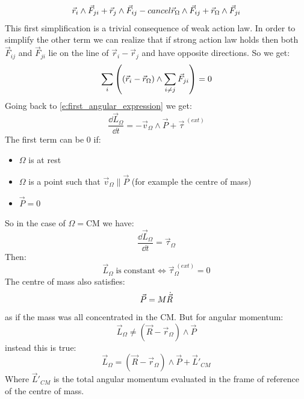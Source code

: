 \begin{equation}
    \vec{r}_i\wedge\vec{F}_{ji} + \vec{r}_j\wedge\vec{F}_{ij}-\\cancel{{\vec{r}_{\Omega}\wedge\vec{F}_{ij}+\vec{r}_{\Omega}\wedge\vec{F}_{ji}}}
\end{equation}
This first simplification is a trivial consequence of weak action law. In order to simplify the other term we can realize that if strong action law holds then both $\vec{F}_{ij}$ and $\vec{F}_{ji}$ lie on the line of $\vec{r}_i-\vec{r}_j$ and have opposite directions.
So we get:
\begin{equation}
    \displaystyle\sum_{i}\left(\left(\vec{r}_i-\vec{r}_{\Omega}\right)\wedge\displaystyle\sum_{i\neq j}\vec{F}_{ji}\right) = 0
\end{equation}
Going back to \eqref{e:first_angular_expression} we get:
\begin{equation}
    \dfrac{\dd{\vec{L}_{\Omega}}}{\dd{t}} = -\vec{v}_{\Omega}\wedge\vec{P} + \vec{\tau}^{\;(ext)}
\end{equation}
The first term can be 0 if:
\begin{itemize}
    \item $\Omega$ is at rest
    \item $\Omega$ is a point such that $\vec{v}_{\Omega} \parallel \vec{P}$ (for example the centre of mass)
    \item $\vec{P}=0$
\end{itemize}
So in the case of $\Omega = \mathrm{CM}$ we have:
\begin{equation} \label{e:first_cardinal}
    \dfrac{\dd{\vec{L}_{\Omega}}}{\dd{t}} = \vec{\tau}_{\Omega}
\end{equation}
Then:
\begin{equation}
    \vec{L}_{\Omega}\;\mathrm{is\;constant} \iff \vec{\tau}_{\Omega}^{\;(ext)}=0
\end{equation}
The centre of mass also satisfies:
\begin{equation}
    \vec{P} = M\dot{\vec{R}}
\end{equation}
as if the mass was all concentrated in the CM. But for angular momentum:
\begin{equation}
    \vec{L}_{\Omega} \neq (\vec{R}-\vec{r}_{\Omega})\wedge\vec{P}
\end{equation}
instead this is true:
\begin{equation}
    \vec{L}_{\Omega} = (\vec{R}-\vec{r}_{\Omega})\wedge\vec{P} + \vec{L}'_{CM}
\end{equation}
Where $\vec{L}'_{CM}$ is the total angular momentum evaluated in the frame of reference of the centre of mass.\\
